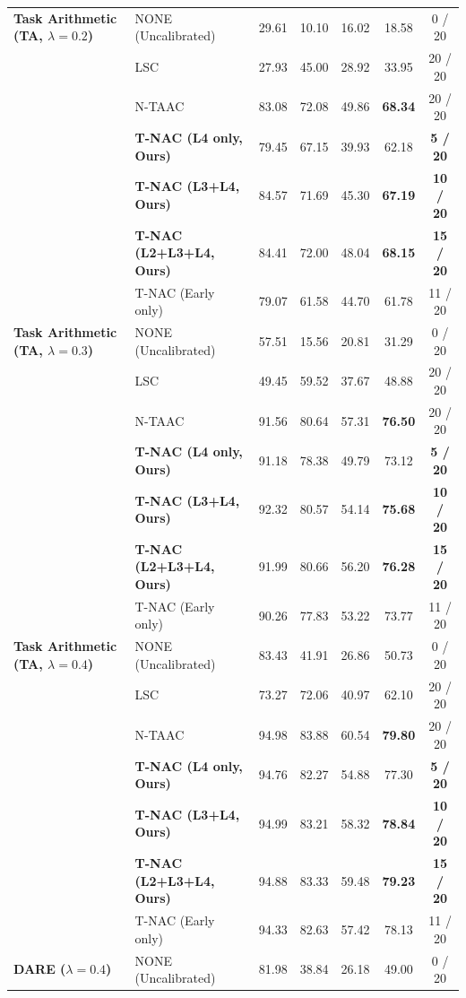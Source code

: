 \documentclass{article}
\theoremstyle{plain}
\theoremstyle{definition}
\begin{document}
\begin{table}[t]
\begin{center}
\begin{scriptsize}
\begin{tabular}{llccccc}
\midrule
\textbf{Task Arithmetic (TA, $\lambda=0.2$)} & NONE (Uncalibrated) & 29.61 & 10.10 & 16.02 & 18.58 & 0 / 20 \\
& LSC & 27.93 & 45.00 & 28.92 & 33.95 & 20 / 20 \\
& N-TAAC & 83.08 & 72.08 & 49.86 & \textbf{68.34} & 20 / 20 \\
& \textbf{T-NAC (L4 only, Ours)} & 79.45 & 67.15 & 39.93 & 62.18 & \textbf{5 / 20} \\
& \textbf{T-NAC (L3+L4, Ours)} & 84.57 & 71.69 & 45.30 & \textbf{67.19} & \textbf{10 / 20} \\
& \textbf{T-NAC (L2+L3+L4, Ours)} & 84.41 & 72.00 & 48.04 & \textbf{68.15} & \textbf{15 / 20} \\
& T-NAC (Early only) & 79.07 & 61.58 & 44.70 & 61.78 & 11 / 20 \\
\midrule
\textbf{Task Arithmetic (TA, $\lambda=0.3$)} & NONE (Uncalibrated) & 57.51 & 15.56 & 20.81 & 31.29 & 0 / 20 \\
& LSC & 49.45 & 59.52 & 37.67 & 48.88 & 20 / 20 \\
& N-TAAC & 91.56 & 80.64 & 57.31 & \textbf{76.50} & 20 / 20 \\
& \textbf{T-NAC (L4 only, Ours)} & 91.18 & 78.38 & 49.79 & 73.12 & \textbf{5 / 20} \\
& \textbf{T-NAC (L3+L4, Ours)} & 92.32 & 80.57 & 54.14 & \textbf{75.68} & \textbf{10 / 20} \\
& \textbf{T-NAC (L2+L3+L4, Ours)} & 91.99 & 80.66 & 56.20 & \textbf{76.28} & \textbf{15 / 20} \\
& T-NAC (Early only) & 90.26 & 77.83 & 53.22 & 73.77 & 11 / 20 \\
\midrule
\textbf{Task Arithmetic (TA, $\lambda=0.4$)} & NONE (Uncalibrated) & 83.43 & 41.91 & 26.86 & 50.73 & 0 / 20 \\
& LSC & 73.27 & 72.06 & 40.97 & 62.10 & 20 / 20 \\
& N-TAAC & 94.98 & 83.88 & 60.54 & \textbf{79.80} & 20 / 20 \\
& \textbf{T-NAC (L4 only, Ours)} & 94.76 & 82.27 & 54.88 & 77.30 & \textbf{5 / 20} \\
& \textbf{T-NAC (L3+L4, Ours)} & 94.99 & 83.21 & 58.32 & \textbf{78.84} & \textbf{10 / 20} \\
& \textbf{T-NAC (L2+L3+L4, Ours)} & 94.88 & 83.33 & 59.48 & \textbf{79.23} & \textbf{15 / 20} \\
& T-NAC (Early only) & 94.33 & 82.63 & 57.42 & 78.13 & 11 / 20 \\
\midrule
\textbf{DARE ($\lambda=0.4$)} & NONE (Uncalibrated) & 81.98 & 38.84 & 26.18 & 49.00 & 0 / 20 \\

\end{tabular}
\end{scriptsize}
\end{center}
\end{table}
\end{document}
